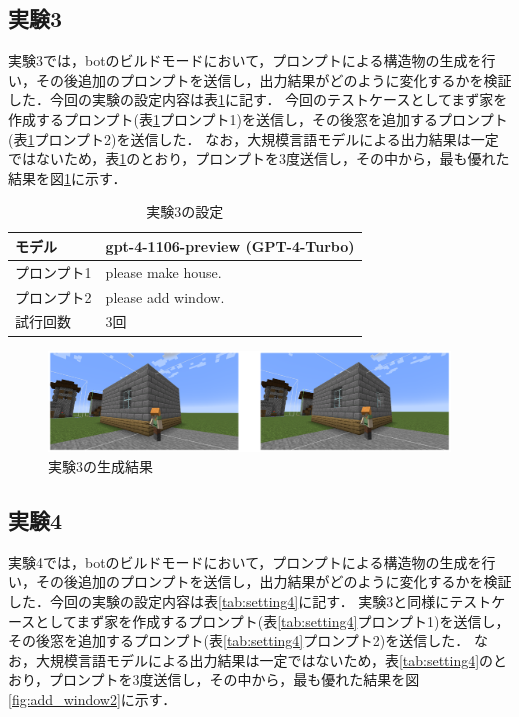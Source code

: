 \subsection{実験3}\label{sec:ex3}
実験3では，botのビルドモードにおいて，プロンプトによる構造物の生成を行い，その後追加のプロンプトを送信し，出力結果がどのように変化するかを検証した．今回の実験の設定内容は表\ref{tab:setting3}に記す．
今回のテストケースとしてまず家を作成するプロンプト(表\ref{tab:setting3}プロンプト1)を送信し，その後窓を追加するプロンプト(表\ref{tab:setting3}プロンプト2)を送信した．
なお，大規模言語モデルによる出力結果は一定ではないため，表\ref{tab:setting3}のとおり，プロンプトを3度送信し，その中から，最も優れた結果を図\ref{fig:add_window}に示す．

\begin{table}[H]
    \caption{実験3の設定}\label{tab:setting3}
    \centering
    \begin{tabular}{ll}
        \hline \hline
        モデル & gpt-4-1106-preview (GPT-4-Turbo) \\
        \hline
        プロンプト1 & please make house. \\
        \hline
        プロンプト2 & please add window. \\
        \hline
        試行回数 & 3回 \\
        \hline
    \end{tabular}
\end{table}

\begin{figure}[H]
    \centering
    \includegraphics[width=0.95\textwidth]{fig/add_window.PNG}
    \caption{実験3の生成結果}
    \label{fig:add_window}
\end{figure}

\subsection{実験4}\label{sec:ex4}
実験4では，botのビルドモードにおいて，プロンプトによる構造物の生成を行い，その後追加のプロンプトを送信し，出力結果がどのように変化するかを検証した．今回の実験の設定内容は表\ref{tab:setting4}に記す．
実験3と同様にテストケースとしてまず家を作成するプロンプト(表\ref{tab:setting4}プロンプト1)を送信し，その後窓を追加するプロンプト(表\ref{tab:setting4}プロンプト2)を送信した．
なお，大規模言語モデルによる出力結果は一定ではないため，表\ref{tab:setting4}のとおり，プロンプトを3度送信し，その中から，最も優れた結果を図\ref{fig:add_window2}に示す．

